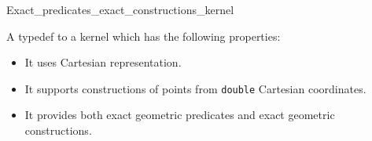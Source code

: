 \begin{ccRefClass}{Exact_predicates_exact_constructions_kernel}

\ccDefinition
A typedef to a kernel which has the following properties:

\begin{itemize}
\item It uses Cartesian representation.
\item It supports constructions of points from \texttt{double} Cartesian
      coordinates.
\item It provides both exact geometric predicates and exact geometric
      constructions.
\end{itemize}


\ccIsModel
{}

\ccSeeAlso
{} \\
 \\

\end{ccRefClass}
